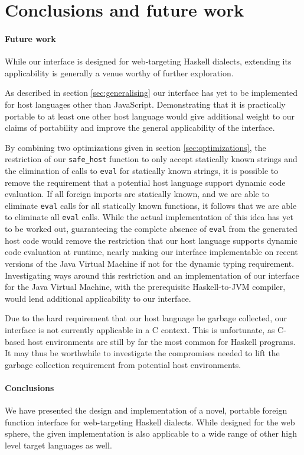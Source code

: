 \documentclass[preprint]{sigplanconf}
\begin{document}
\section{Conclusions and future work}
\label{sec:conclusion}
\paragraph{Future work}
While our interface is designed for web-targeting Haskell dialects, extending
its applicability is generally a venue worthy of further exploration.

As described in section \ref{sec:generalising} our interface has yet to be
implemented for host languages other than JavaScript. Demonstrating that
it is practically portable to at least one other host language would give
additional weight to our claims of portability and improve the general
applicability of the interface.

By combining two optimizations given in section \ref{sec:optimizations},
the restriction of our \lstinline!safe_host! function to only accept statically
known strings and the elimination of calls to \lstinline!eval! for statically
known strings, it is possible to remove the requirement that a potential
host language support dynamic code evaluation.
If all foreign imports are statically known,
and we are able to eliminate \lstinline!eval! calls for all statically known
functions, it follows that we are able to eliminate all \lstinline!eval! calls.
While the actual implementation of this idea has yet to be worked out,
guaranteeing the complete absence of \lstinline!eval! from the generated host
code would remove the restriction that our host language supports dynamic code
evaluation at runtime, nearly making our interface implementable on
recent versions of the Java Virtual Machine if not for the dynamic typing
requirement. Investigating ways around this restriction and an implementation
of our interface for the Java Virtual Machine, with the
prerequisite Haskell-to-JVM compiler, would lend additional applicability to
our interface.

Due to the hard requirement that our host language be garbage collected,
our interface is not currently applicable in a C context. This is unfortunate,
as C-based host environments are still by far the most common for Haskell
programs. It may thus be worthwhile to investigate the compromises needed
to lift the garbage collection requirement from potential host environments.

\paragraph{Conclusions}
We have presented the design and implementation of a novel, portable foreign
function interface for web-targeting Haskell dialects. While designed for the
web sphere, the given implementation is also applicable to a wide range of
other high level target languages as well.
\end{document}
